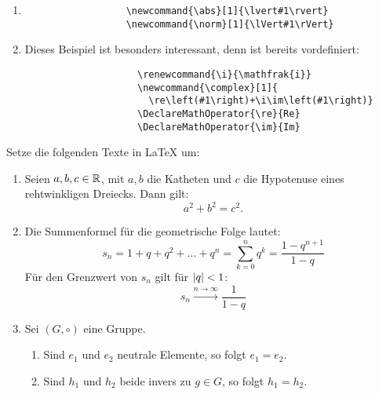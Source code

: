\begin{uebung}
\begin{loesung}
\begin{enumerate}[label=(\alph*)]
\begin{verbatim}
            \end{pmatrix}}
            \end{verbatim}
            \item \begin{verbatim}
                  \newcommand{\abs}[1]{\lvert#1\rvert}
                  \newcommand{\norm}[1]{\lVert#1\rVert}
                  \end{verbatim}
            \item Dieses Beispiel ist besonders interessant, denn  ist bereits vordefiniert: \\
                    \begin{verbatim}
                    \renewcommand{\i}{\mathfrak{i}}
                    \newcommand{\complex}[1]{
                      \re\left(#1\right)+\i\im\left(#1\right)}
                    \DeclareMathOperator{\re}{Re}
                    \DeclareMathOperator{\im}{Im}
                    \end{verbatim}
            \end{enumerate}
        \end{loesung}
\item Setze die folgenden Texte in \LaTeX{} um:
        \begin{enumerate}[label=(\alph*)]
         \item Seien $a,b,c\in\mathbb{R}$, mit $a,b$ die Katheten und $c$ die Hypotenuse eines rehtwinkligen Dreiecks. Dann gilt: 
                \[
                    a^2+b^2=c^2.
                \]
          \item Die Summenformel für die geometrische Folge lautet:
          \[
              s_n = 1+ q+q^2+\dots+q^n = \sum_{k=0}^{n}q^k = \frac{1-q^{n+1}}{1-q}
          \]
          Für den Grenzwert von $s_n$ gilt für $\abs{q}<1$: 
          \[
              s_n\xrightarrow{n\rightarrow\infty} \frac{1}{1-q}
          \]
          \item  
              \begin{mythm}
                  Sei $(G,\circ)$ eine Gruppe.
                  \begin{enumerate}[label=(\roman*)]
                      \item Sind $e_1$ und $e_2$ neutrale Elemente, so folgt $e_1=e_2$.
                      \item Sind $h_1$ und $h_2$ beide invers zu $g\in G$, so folgt $h_1 = h_2$.  
                  \end{enumerate}
              \end{mythm}

\end{enumerate}
\end{uebung}
